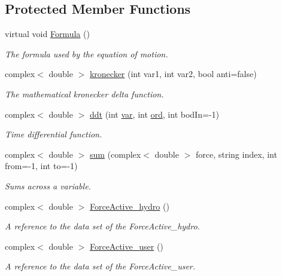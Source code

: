 \subsection*{Protected Member Functions}
\begin{DoxyCompactItemize}
\item 
virtual void \hyperlink{class_equationof_motion_a6f198d1a20c00e3f757b0729eb2c6854}{Formula} ()
\begin{DoxyCompactList}\small\item\em The formula used by the equation of motion. \end{DoxyCompactList}\item 
complex$<$ double $>$ \hyperlink{class_equationof_motion_a4d3a5ac1f92007d33678b4fdd5321e6e}{kronecker} (int var1, int var2, bool anti=false)
\begin{DoxyCompactList}\small\item\em The mathematical kronecker delta function. \end{DoxyCompactList}\item 
complex$<$ double $>$ \hyperlink{class_equationof_motion_acf593f85f406ab3a21d128f65fccfd85}{ddt} (int \hyperlink{class_equationof_motion_ab69511cc5037376cf7da80ce30d9eaab}{var}, int \hyperlink{class_equationof_motion_a31f904818ce75c9e2a2b5cff9fc707a5}{ord}, int bod\-In=-\/1)
\begin{DoxyCompactList}\small\item\em Time differential function. \end{DoxyCompactList}\item 
complex$<$ double $>$ \hyperlink{class_equationof_motion_a96e7591eda1ff48af511e20c0f132312}{sum} (complex$<$ double $>$ force, string index, int from=-\/1, int to=-\/1)
\begin{DoxyCompactList}\small\item\em Sums across a variable. \end{DoxyCompactList}\item 
complex$<$ double $>$ \hyperlink{class_equationof_motion_a61f33c3fd47ae2b66db1982b9c973ec1}{Force\-Active\-\_\-hydro} ()
\begin{DoxyCompactList}\small\item\em A reference to the data set of the Force\-Active\-\_\-hydro. \end{DoxyCompactList}\item 
complex$<$ double $>$ \hyperlink{class_equationof_motion_a238df115825cbe08522bdc10b84880b9}{Force\-Active\-\_\-user} ()
\begin{DoxyCompactList}\small\item\em A reference to the data set of the Force\-Active\-\_\-user. \end{DoxyCompactList}\item 

\end{DoxyCompactItemize}

